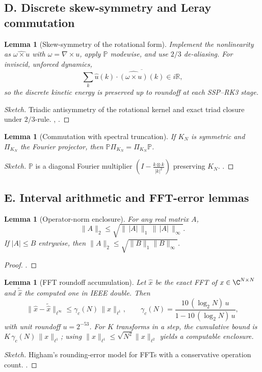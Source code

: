 \IfFileExists{nyjm.cls}{\documentclass[11pt]{nyjm}}{\documentclass[11pt]{amsart}}
\newcommand{\R}{\mathbb{R}}
\theoremstyle{plain}
\newtheorem{lemma}[theorem]{Lemma}
\theoremstyle{definition}
\theoremstyle{remark}
\begin{document}
\subsection*{D. Discrete skew-symmetry and Leray commutation}\label{app:discrete}
\begin{lemma}[Skew-symmetry of the rotational form]\label{lem:skew}
Implement the nonlinearity as $\widehat{\omega\times u}$ with $\omega=\nabla\times u$, apply $\mathbb P$ modewise, and use $2/3$ de-aliasing. For inviscid, unforced dynamics,
\[
\sum_k \widehat u(k)\cdot \overline{\widehat{(\omega\times u)}(k)}\in i\R,
\]
so the discrete kinetic energy is preserved up to roundoff at each SSP–RK3 stage.
\end{lemma}
\begin{proof}[Sketch]
Triadic antisymmetry of the rotational kernel and exact triad closure under $2/3$-rule. \cite[§3.6]{CanutoQuarteroniHussainiZang2006}, \cite{PattersonOrszag1971,Morinishi1998}.
\end{proof}

\begin{lemma}[Commutation with spectral truncation]\label{lem:commute}
If $K_N$ is symmetric and $\Pi_{K_N}$ the Fourier projector, then $\mathbb P\Pi_{K_N}=\Pi_{K_N}\mathbb P$.
\end{lemma}
\begin{proof}[Sketch]
$\mathbb P$ is a diagonal Fourier multiplier $(I-\frac{k\otimes k}{|k|^2})$ preserving $K_N$. \cite[§I.1]{Temam2001}.
\end{proof}

\subsection*{E. Interval arithmetic and FFT-error lemmas}\label{app:interval}
\begin{lemma}[Operator-norm enclosure]\label{lem:opnorm}
For any real matrix $A$,
\[
\|A\|_2\le \sqrt{\|\,|A|\,\|_1\,\|\,|A|\,\|_\infty}.
\]
If $|A|\le B$ entrywise, then $\|A\|_2\le \sqrt{\|B\|_1\|B\|_\infty}$.
\end{lemma}
\begin{proof}
\cite[Thm.~5.6.18]{HornJohnsonMatrix}.
\end{proof}

\begin{lemma}[FFT roundoff accumulation]\label{lem:fft}
Let $\widehat x$ be the exact FFT of $x\in\C^{N\times N}$ and $\widetilde{\widehat x}$ the computed one in IEEE double. Then
\[
\|\widehat x-\widetilde{\widehat x}\|_{\ell^\infty}\le \gamma_c(N)\,\|x\|_{\ell^1},\qquad
\gamma_c(N)=\frac{10\,(\log_2 N)\,u}{1-10\,(\log_2 N)\,u},
\]
with unit roundoff $u=2^{-53}$. For $K$ transforms in a step, the cumulative bound is $K\,\gamma_c(N)\,\|x\|_{\ell^1}$; using $\|x\|_{\ell^1}\le \sqrt{N^2}\|x\|_{\ell^2}$ yields a computable enclosure.
\end{lemma}
\begin{proof}[Sketch]
Higham’s rounding-error model for FFTs with a conservative operation count. \cite[Ch.~22]{Higham2002}.
\end{proof}
\end{document}
